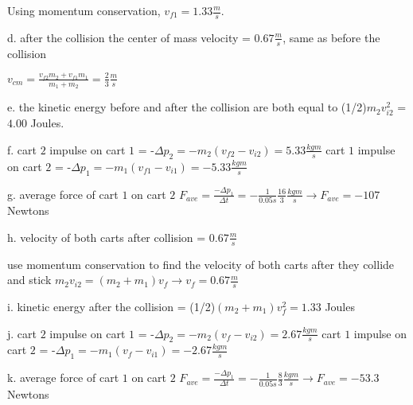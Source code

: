 Using momentum conservation, $v_{f1} = 1.33 \frac{m}{s}$.\newline


d. after the collision the center of mass velocity = $0.67 \frac{m}{s}$, same as before the collision\newline

$v_{cm} = \frac{v_{f2}m_{2} + v_{f1}m_{1}}{m_{1} + m_{2}} = \frac{2}{3} \frac{m}{s}$\newline


e. the kinetic energy before and after the collision are both equal to
 (1/2)$m_{2}v_{i2}^{2}$ = $4.00$ Joules.\newline


f. cart $2$ impulse on cart $1$ = -$\Delta p_{2} = -m_{2}(v_{f2} - v_{i2}) = 5.33 \frac{kg m}{s}$\newline
cart $1$ impulse on cart $2$ = -$\Delta p_{1} = -m_{1}(v_{f1} - v_{i1}) = -5.33 \frac{kg m}{s}$\newline


g. average force of cart $1$ on cart $2$ $F_{ave} = \frac{-\Delta p_{1}}{\Delta t} = 
-\frac{1}{0.05 s} \frac{16}{3} \frac{kg m}{s} \rightarrow F_{ave} = -107$ Newtons\newline



h. velocity of both carts after collision = $0.67 \frac{m}{s}$\newline

use momentum conservation to find the velocity of both carts after they collide and stick\newline
$m_{2}v_{i2} = (m_{2} + m_{1})v_{f} \rightarrow v_{f} = 0.67 \frac{m}{s}$\newline


i. kinetic energy after the collision = (1/2)$(m_{2} + m_{1})v_{f}^{2} = 1.33$ Joules\newline



j. cart $2$ impulse on cart $1$ = -$\Delta p_{2} = -m_{2}(v_{f} - v_{i2}) = 2.67 \frac{kg m}{s}$\newline
cart $1$ impulse on cart $2$ = -$\Delta p_{1} = -m_{1}(v_{f} - v_{i1}) = -2.67 \frac{kg m}{s}$\newline



k. average force of cart $1$ on cart $2$ $F_{ave} = \frac{-\Delta p_{1}}{\Delta t} = 
-\frac{1}{0.05 s} \frac{8}{3} \frac{kg m}{s} \rightarrow F_{ave} = -53.3$ Newtons


